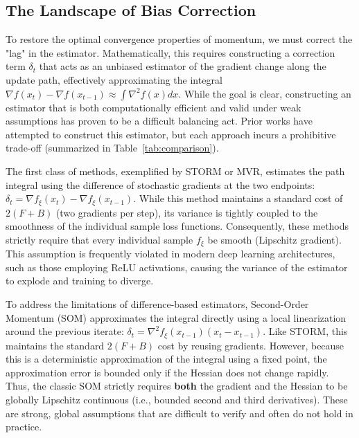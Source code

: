 \documentclass{article}
\theoremstyle{plain}
\theoremstyle{definition}
\theoremstyle{remark}
\begin{document}
\subsection{The Landscape of Bias Correction}
\label{subsec:bias_landscape}

To restore the optimal convergence properties of momentum, we must correct the "lag" in the estimator. Mathematically, this requires constructing a correction term $\delta_t$ that acts as an unbiased estimator of the gradient change along the update path, effectively approximating the integral $\nabla f(x_t) - \nabla f(x_{t-1}) \approx \int \nabla^2 f(x) dx$. While the goal is clear, constructing an estimator that is both computationally efficient and valid under weak assumptions has proven to be a difficult balancing act. Prior works have attempted to construct this estimator, but each approach incurs a prohibitive trade-off (summarized in Table~\ref{tab:comparison}).

The first class of methods, exemplified by STORM or MVR, estimates the path integral using the difference of stochastic gradients at the two endpoints: $\delta_t = \nabla f_{\xi}(x_t) - \nabla f_{\xi}(x_{t-1})$. While this method maintains a standard cost of $2(F+B)$ (two gradients per step), its variance is tightly coupled to the smoothness of the individual sample loss functions. Consequently, these methods strictly require that every individual sample $f_\xi$ be smooth (Lipschitz gradient). This assumption is frequently violated in modern deep learning architectures, such as those employing ReLU activations, causing the variance of the estimator to explode and training to diverge.

To address the limitations of difference-based estimators, Second-Order Momentum (SOM) approximates the integral directly using a local linearization around the previous iterate: $\delta_t = \nabla^2 f_{\xi}(x_{t-1})(x_t - x_{t-1})$. Like STORM, this maintains the standard $2(F+B)$ cost by reusing gradients. However, because this is a deterministic approximation of the integral using a fixed point, the approximation error is bounded only if the Hessian does not change rapidly. Thus, the classic SOM strictly requires \textbf{both} the gradient and the Hessian to be globally Lipschitz continuous (i.e., bounded second and third derivatives). These are strong, global assumptions that are difficult to verify and often do not hold in practice.
\end{document}
